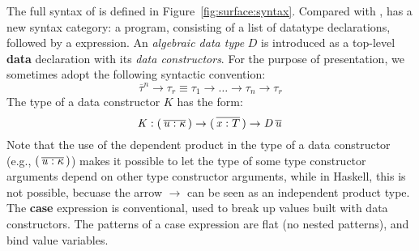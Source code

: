 The full syntax of \sufcc is defined in Figure~\ref{fig:surface:syntax}. Compared with \name, \sufcc has a new syntax category: a program, consisting of a list of datatype declarations, followed by a expression. An \emph{algebraic data type} $D$ is introduced as a top-level \textbf{data} declaration with its \emph{data constructors}. For the purpose of presentation, we sometimes adopt the following syntactic convention:
\[
\overline{\tau}^n \rightarrow \tau_r \equiv \tau_1 \rightarrow \dots \rightarrow \tau_n \rightarrow \tau_r
\]
The type of a data constructor $K$ has the form:
\[
\mathit{K}  :  (  \,\overline{  \mathit{u}  :  \kappa  }\,  )  \rightarrow  (  \,\overline{  \mathit{x}  :  T  }\,  )  \rightarrow  \mathit{D}    \,\overline{  \mathit{u}  }\,
\]
 
Note that the use of the dependent product in the type of a data
constructor (e.g., $(  \,\overline{  \mathit{u}  :  \kappa  }\,  )$) makes it possible to let the type
of some type constructor arguments depend on other type constructor
arguments, while in Haskell, this is not possible, becuase the arrow
$\rightarrow$ can be seen as an independent product type. The
\textbf{case} expression is conventional, used to break up values
built with data constructors.  The patterns of a case expression are
flat (no nested patterns), and bind value variables.

